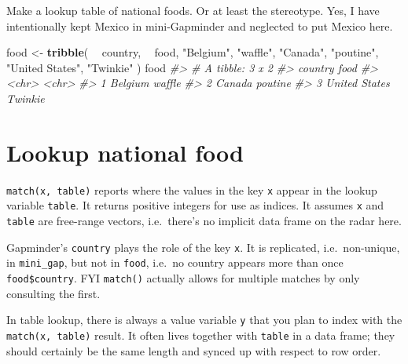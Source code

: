 \documentclass[
]{book}
\newenvironment{Shaded}{\begin{snugshade}}{\end{snugshade}}
\newcommand{\CommentTok}[1]{\textcolor[rgb]{0.56,0.35,0.01}{\textit{#1}}}
\newcommand{\DataTypeTok}[1]{\textcolor[rgb]{0.13,0.29,0.53}{#1}}
\newcommand{\KeywordTok}[1]{\textcolor[rgb]{0.13,0.29,0.53}{\textbf{#1}}}
\newcommand{\NormalTok}[1]{#1}
\newcommand{\OperatorTok}[1]{\textcolor[rgb]{0.81,0.36,0.00}{\textbf{#1}}}
\newcommand{\StringTok}[1]{\textcolor[rgb]{0.31,0.60,0.02}{#1}}
\begin{document}
Make a lookup table of national foods. Or at least the stereotype. Yes, I have intentionally kept Mexico in mini-Gapminder and neglected to put Mexico here.

\begin{Shaded}
\begin{Highlighting}[]
\NormalTok{food <-}\StringTok{ }\KeywordTok{tribble}\NormalTok{(}
        \OperatorTok{~}\StringTok{ }\NormalTok{country,    }\OperatorTok{~}\StringTok{ }\NormalTok{food,}
        \StringTok{"Belgium"}\NormalTok{,  }\StringTok{"waffle"}\NormalTok{,}
         \StringTok{"Canada"}\NormalTok{, }\StringTok{"poutine"}\NormalTok{,}
  \StringTok{"United States"}\NormalTok{, }\StringTok{"Twinkie"}
\NormalTok{)}
\NormalTok{food}
\CommentTok{#> # A tibble: 3 x 2}
\CommentTok{#>   country       food   }
\CommentTok{#>   <chr>         <chr>  }
\CommentTok{#> 1 Belgium       waffle }
\CommentTok{#> 2 Canada        poutine}
\CommentTok{#> 3 United States Twinkie}
\end{Highlighting}
\end{Shaded}

\hypertarget{lookup-national-food}{%
\section{Lookup national food}\label{lookup-national-food}}

\texttt{match(x,\ table)} reports where the values in the key \texttt{x} appear in the lookup variable \texttt{table}. It returns positive integers for use as indices. It assumes \texttt{x} and \texttt{table} are free-range vectors, i.e.~there's no implicit data frame on the radar here.

Gapminder's \texttt{country} plays the role of the key \texttt{x}. It is replicated, i.e.~non-unique, in \texttt{mini\_gap}, but not in \texttt{food}, i.e.~no country appears more than once \texttt{food\$country}. FYI \texttt{match()} actually allows for multiple matches by only consulting the first.

\begin{Shaded}
\end{Shaded}

In table lookup, there is always a value variable \texttt{y} that you plan to index with the \texttt{match(x,\ table)} result. It often lives together with \texttt{table} in a data frame; they should certainly be the same length and synced up with respect to row order.
\end{document}
